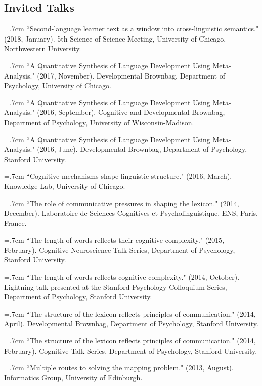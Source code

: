 \documentclass[letterpaper]{article}
\begin{document}
\subsection*{Invited Talks}

\hangindent=.7cm ``Second-language learner text as a window into cross-linguistic semantics." (2018, January). 5th Science of Science Meeting,  University of Chicago, Northwestern University.

\hangindent=.7cm ``A Quantitative Synthesis of Language Development Using Meta-Analysis." (2017, November). Developmental Brownbag, Department of Psychology,  University of Chicago.

\hangindent=.7cm ``A Quantitative Synthesis of Language Development Using Meta-Analysis." (2016, September). Cognitive and Developmental Brownbag, Department of Psychology,  University of Wisconsin-Madison.

\hangindent=.7cm ``A Quantitative Synthesis of Language Development Using Meta-Analysis." (2016, June). Developmental Brownbag, Department of Psychology,  Stanford University.

\hangindent=.7cm  ``Cognitive mechanisms shape linguistic structure."  (2016, March).  Knowledge Lab, University of Chicago.

\hangindent=.7cm ``The role of communicative pressures in shaping the lexicon." (2014, December). Laboratoire de Sciences Cognitives et Psycholinguistique, ENS, Paris, France.

\hangindent=.7cm ``The length of words reflects their cognitive complexity." (2015, February). Cognitive-Neuroscience Talk Series, Department of Psychology, Stanford University.

\hangindent=.7cm ``The length of words reflects cognitive complexity." (2014, October). Lightning talk presented at the Stanford Psychology Colloquium Series, Department of Psychology, Stanford University.


\hangindent=.7cm ``The structure of the lexicon reflects principles of communication." (2014, April). Developmental Brownbag, Department of Psychology, Stanford University.

\hangindent=.7cm ``The structure of the lexicon reflects principles of communication." (2014, February). Cognitive Talk Series, Department of Psychology, Stanford University.

\hangindent=.7cm ``Multiple routes to solving the mapping problem." (2013, August). Informatics Group, University of Edinburgh.
 
\end{document}
